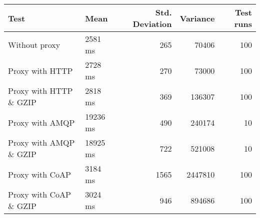\begin{tabular}{llrrr}
\hline
 Test                   & Mean     &   Std. Deviation &   Variance &   Test runs \\
\hline
 Without proxy          & 2581 ms  &              265 &      70406 &         100 \\
 Proxy with HTTP        & 2728 ms  &              270 &      73000 &         100 \\
 Proxy with HTTP \& GZIP & 2818 ms  &              369 &     136307 &         100 \\
 Proxy with AMQP        & 19236 ms &              490 &     240174 &          10 \\
 Proxy with AMQP \& GZIP & 18925 ms &              722 &     521008 &          10 \\
 Proxy with CoAP        & 3184 ms  &             1565 &    2447810 &         100 \\
 Proxy with CoAP \& GZIP & 3024 ms  &              946 &     894686 &         100 \\
\hline
\end{tabular}